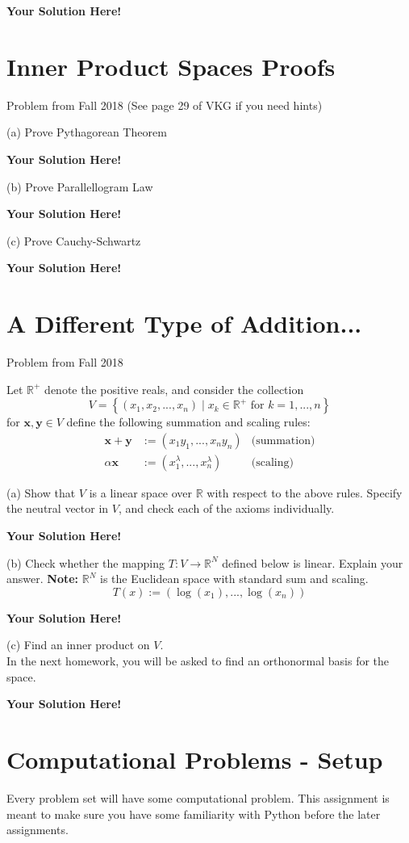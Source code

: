 \documentclass[12pt]{article}
\newcommand{\x}{\mathbf{x}}
\newcommand{\y}{\mathbf{y}}
\newcommand{\0}{\mathbf{0}}
\newcommand{\solspace}{\vspace{3mm} \textbf{Your Solution Here!} \vspace{3mm}}
\begin{document}
\solspace


\pagebreak

\section{Inner Product Spaces Proofs}
Problem from Fall 2018 (See page 29 of VKG if you need hints)
\vspace{2mm}

(a) Prove Pythagorean Theorem

\solspace

(b) Prove Parallellogram Law

\solspace

(c) Prove Cauchy-Schwartz 

\solspace

\pagebreak
\section{A Different Type of Addition...}
Problem from Fall 2018

Let $\mathbb{R}^+$ denote the positive reals, and consider the collection 
$$
V = \left\{( x_1, x_2, ..., x_n) \mid x_k \in \mathbb{R}^+ \text{ for } k = 1, ..., n\right\}
$$
for $\x, \y \in V$ define the following summation and scaling rules:
\begin{align*}
\x + \y &:= (x_1 y_1, ..., x_n y_n) & \text{(summation)} \\
\alpha \x &:= (x_1^\lambda, ..., x_n^\lambda) & \text{(scaling)}
\end{align*}

(a) Show that $V$ is a linear space over $\mathbb{R}$ with respect to the above rules. Specify the neutral vector in $V$, and check each of the axioms individually.

\solspace

(b) Check whether the mapping $T : V \rightarrow \mathbb{R}^N$ defined below is linear. Explain your answer.
\textbf{Note: } $\mathbb{R}^N$ is the Euclidean space with standard sum and scaling.
$$
T(x) := (\log(x_1), ..., \log(x_n))
$$

\solspace

(c) Find an inner product on $V$. \\In the next homework, you will be asked to find an orthonormal basis for the space.

\solspace

\pagebreak
\section{Computational Problems - Setup}
Every problem set will have some computational problem.
This assignment is meant to make sure you have some familiarity with Python before the later assignments.
\end{document}
